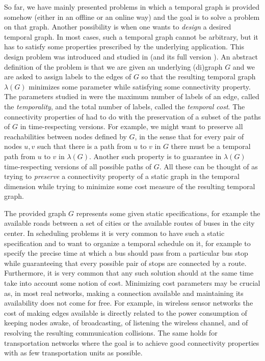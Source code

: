 \documentclass[oribibl, 11pt]{llncs}
\begin{document}
So far, we have mainly presented problems in which a temporal graph is provided somehow (either in an offline or an online way) and the goal is to solve a problem on that graph. Another possibility is when one wants to \emph{design} a desired temporal graph. In most cases, such a temporal graph cannot be arbitrary, but it has to satisfy some properties prescribed by the underlying application. This design problem was introduced and studied in \cite{MMCS13} (and its full version \cite{MMS15}). An abstract definition of the problem is that we are given an underlying (di)graph $G$ and we are asked to assign labels to the edges of $G$ so that the resulting temporal graph $\lambda (G)$ minimizes some parameter while satisfying some connectivity property. The parameters studied in \cite{MMCS13} were the maximum number of labels of an edge, called the \emph{temporality}, and the total number of labels, called the \emph{temporal cost}. The connectivity properties of \cite{MMCS13} had to do with the preservation of a subset of the paths of $G$ in time-respecting versions. For example, we might want to preserve all reachabilities between nodes defined by $G$, in the sense that for every pair of nodes $u,v$ such that there is a path from $u$ to $v$ in $G$ there must be a temporal path from $u$ to $v$ in $\lambda (G)$. Another such property is to guarantee in $\lambda (G)$ time-respecting versions of all possible paths of $G$. All these can be thought of as trying to \emph{preserve} a connectivity property of a static graph in the temporal dimension while trying to minimize some cost measure of the resulting temporal graph. 

The provided graph $G$ represents some given static specifications, for example the available roads between a set of cities or the available routes of buses in the city center. In scheduling problems it is very common to have such a static specification and to want to organize a temporal schedule on it, for example to specify the precise time at which a bus should pass from a particular bus stop while guaranteeing that every possible pair of stops are connected by a route. Furthermore, it is very common that any such solution should at the same time take into account some notion of cost. Minimizing cost parameters may be crucial as, in most real networks, making a connection available and maintaining its availability does not come for free. For example, in wireless sensor networks the cost of making edges available is directly related to the power consumption of keeping nodes awake, of broadcasting, of listening the wireless channel, and of resolving the resulting communication collisions. The same holds for transportation networks where the goal is to achieve good connectivity properties with as few transportation units as possible.
\end{document}
